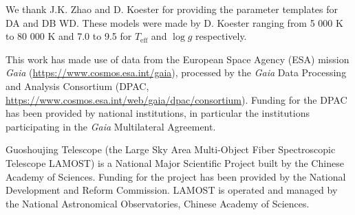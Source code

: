 \documentclass{aastex631}
\begin{document}
\begin{acknowledgments}
We thank J.K. Zhao and D. Koester for providing the parameter templates for DA and DB WD.
These models were made by D. Koester ranging from 5 000 K to 80 000 K and 7.0 to 9.5 for $T_{\text{eff}}$ and $\log g$ respectively.

This work has made use of data from the European Space Agency (ESA) mission
{\it Gaia} (\url{https://www.cosmos.esa.int/gaia}), processed by the {\it Gaia}
Data Processing and Analysis Consortium (DPAC,
\url{https://www.cosmos.esa.int/web/gaia/dpac/consortium}). Funding for the DPAC
has been provided by national institutions, in particular the institutions
participating in the {\it Gaia} Multilateral Agreement.

Guoshoujing Telescope (the Large Sky Area Multi-Object Fiber Spectroscopic Telescope LAMOST) is a National Major Scientific Project built by the Chinese Academy of Sciences. Funding for the project has been provided by the National Development and Reform Commission. LAMOST is operated and managed by the National Astronomical Observatories, Chinese Academy of Sciences.
\end{acknowledgments}

%

\vspace{5mm}




{}



\end{document}

